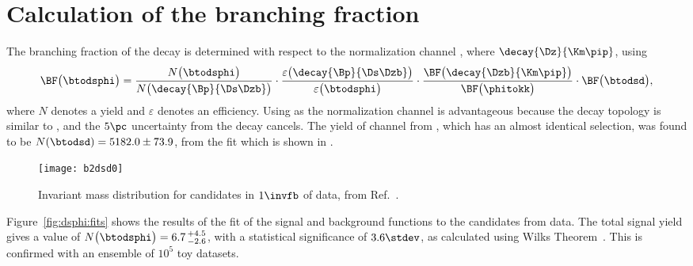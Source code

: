 \section{Calculation of the branching fraction}
\label{sec:dsphi:bf}
The branching fraction of the decay \btodsphi is determined with respect to the normalization
channel \btodsd, where $\decay{\Dz}{\Km\pip}$, using
\begin{equation}
  \BF\big(\btodsphi\big) =
  \frac{N\big(\btodsphi\big)}{N\big(\decay{\Bp}{\Ds\Dzb}\big)}
  \cdot
  \frac{\varepsilon\big(\decay{\Bp}{\Ds\Dzb}\big)}{\varepsilon\big(\btodsphi\big)}
  \cdot
  \frac{\BF\big(\decay{\Dzb}{\Km\pip}\big)}{\BF\big(\phitokk\big)}
  \cdot
  \BF\big(\btodsd\big)
  ,
  \label{eq:dsphi:bf}
\end{equation}
where $N$ denotes a yield and $\varepsilon$ denotes an efficiency.
Using \btodsd as the normalization channel is advantageous because the decay topology is similar to
\btodsphi, and the $5\pc$ uncertainty from the decay \dstokkpi cancels.
The yield of \btodsd channel from , which has an almost identical
selection, was found to be $N(\btodsd) = 5182.0\pm73.9$, from the fit which is shown in
.



\begin{figure}
  \begin{center}
    \texttt{[image: b2dsd0]}
    \caption[Fit to the normalization channel \btodsd]
    {\small
      Invariant mass distribution for \btodsd candidates in $1\invfb$ of \lhcb data, from
      Ref.~\protect\cite{LHCb-CONF-2012-009}.
    }
    \label{fig:dsphi:dsd}
  \end{center}
\end{figure}







Figure~\ref{fig:dsphi:fits} shows the results of the fit of the signal and background functions to
the \btodsphi candidates from data.
The total signal yield gives a value of $N\big(\btodsphi\big)=6.7\,^{+4.5}_{-2.6}$, with a
statistical significance of $3.6\stdev$, as calculated using Wilks Theorem~\cite{wilks1938}.
This is confirmed with an ensemble of $10^5$ toy datasets.

